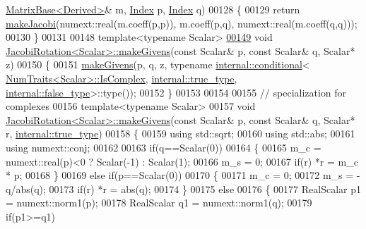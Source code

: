 \begin{DoxyCode}
      \hyperlink{group___core___module_class_eigen_1_1_matrix_base}{MatrixBase<Derived>}& m, \hyperlink{namespace_eigen_a62e77e0933482dafde8fe197d9a2cfde}{Index} p, \hyperlink{namespace_eigen_a62e77e0933482dafde8fe197d9a2cfde}{Index} q)
00128 \{
00129   \textcolor{keywordflow}{return} \hyperlink{group___jacobi___module_a69076401f22e883dc76b6ff9074ac669}{makeJacobi}(numext::real(m.coeff(p,p)), m.coeff(p,q), numext::real(m.coeff(q,q)));
00130 \}
00131 
00148 \textcolor{keyword}{template}<\textcolor{keyword}{typename} Scalar>
\hyperlink{group___jacobi___module_af73c81e9cc139b7e0d877ce553b02ec0}{00149} \textcolor{keywordtype}{void} \hyperlink{group___jacobi___module_af73c81e9cc139b7e0d877ce553b02ec0}{JacobiRotation<Scalar>::makeGivens}(\textcolor{keyword}{const} Scalar& p, \textcolor{keyword}{const} Scalar& q,
       Scalar* z)
00150 \{
00151   \hyperlink{group___jacobi___module_af73c81e9cc139b7e0d877ce553b02ec0}{makeGivens}(p, q, z, \textcolor{keyword}{typename} \hyperlink{struct_eigen_1_1internal_1_1conditional}{internal::conditional}<
      \hyperlink{group___core___module_struct_eigen_1_1_num_traits}{NumTraits<Scalar>::IsComplex}, \hyperlink{struct_eigen_1_1internal_1_1true__type}{internal::true\_type}, 
      \hyperlink{struct_eigen_1_1internal_1_1false__type}{internal::false\_type}>::type());
00152 \}
00153 
00154 
00155 \textcolor{comment}{// specialization for complexes}
00156 \textcolor{keyword}{template}<\textcolor{keyword}{typename} Scalar>
00157 \textcolor{keywordtype}{void} \hyperlink{group___jacobi___module_af73c81e9cc139b7e0d877ce553b02ec0}{JacobiRotation<Scalar>::makeGivens}(\textcolor{keyword}{const} Scalar& p, \textcolor{keyword}{const} Scalar& q,
       Scalar* r, \hyperlink{struct_eigen_1_1internal_1_1true__type}{internal::true\_type})
00158 \{
00159   \textcolor{keyword}{using} std::sqrt;
00160   \textcolor{keyword}{using} std::abs;
00161   \textcolor{keyword}{using} numext::conj;
00162   
00163   \textcolor{keywordflow}{if}(q==Scalar(0))
00164   \{
00165     m\_c = numext::real(p)<0 ? Scalar(-1) : Scalar(1);
00166     m\_s = 0;
00167     \textcolor{keywordflow}{if}(r) *r = m\_c * p;
00168   \}
00169   \textcolor{keywordflow}{else} \textcolor{keywordflow}{if}(p==Scalar(0))
00170   \{
00171     m\_c = 0;
00172     m\_s = -q/abs(q);
00173     \textcolor{keywordflow}{if}(r) *r = abs(q);
00174   \}
00175   \textcolor{keywordflow}{else}
00176   \{
00177     RealScalar p1 = numext::norm1(p);
00178     RealScalar q1 = numext::norm1(q);
00179     \textcolor{keywordflow}{if}(p1>=q1)

\end{DoxyCode}
